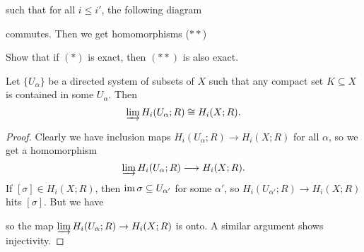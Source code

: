 \begin{exercise}
\begin{enumerate}
      such that for all $i \le i'$, the
      following diagram
      \begin{center}
      \end{center}
      commutes. Then we get homomorphisms ($**$)
      \begin{center}
      \end{center}
      Show that if $(*)$ is exact, then
      $(**)$ is also exact.
  \end{enumerate}
\end{exercise}

\begin{lemma}
  Let $\{U_\alpha\}$ be a directed system
  of subsets of $X$ such that any compact
  set $K \subseteq X$ is contained in some
  $U_\alpha$. Then
  \[
    \varinjlim H_i(U_\alpha; R)
    \cong H_i(X; R).
  \]
\end{lemma}

\begin{proof}
  Clearly we have inclusion maps
  $H_i(U_\alpha; R) \to H_i(X; R)$ for all
  $\alpha$, so we get a homomorphism
  \[
    \varinjlim H_i(U_\alpha; R)
    \longrightarrow H_i(X; R).
  \]
  If $[\sigma] \in H_i(X; R)$, then
  $\operatorname{im} \sigma \subseteq U_{\alpha'}$ for
  some $\alpha'$, so
  $H_i(U_{\alpha'}; R) \to H_i(X; R)$
  hits $[\sigma]$. But we have
  \begin{center}
  \end{center}
  so the map $\varinjlim H_i(U_\alpha; R) \to H_i(X; R)$
  is onto.
  A similar argument shows injectivity.
\end{proof}

